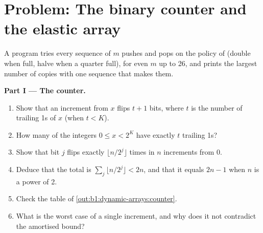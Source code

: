 \section{Problem: The binary counter and the elastic array}\label{sec:b1:dynamic-arrays:problem}

\begin{problem}\label{pb:b1:dynamic-arrays:1}
A program tries every sequence of $m$ pushes and pops on the policy of  (double when full, halve when a
quarter full), for even $m$ up to 26, and prints the largest number of copies with one sequence that makes them.
\label{lst:b1:dynamic-arrays:elastic}
\label{out:b1:dynamic-arrays:elastic}
\label{out:b1:dynamic-arrays:counter-dec}

\medskip\noindent\textbf{Part I --- The counter.}
\begin{enumerate}
\item Show that an increment from $x$ flips $t + 1$ bits, where $t$ is the number of trailing 1s of $x$ (when $t < K$).
\item How many of the integers $0 \leq x < 2^K$ have exactly $t$ trailing 1s?
\item Show that bit $j$ flips exactly $\lfloor n/2^j \rfloor$ times in $n$ increments from 0.
\item Deduce that the total is $\sum_j \lfloor n/2^j \rfloor < 2n$, and that it equals $2n - 1$ when $n$ is a power of 2.
\item Check the table of \cref{out:b1:dynamic-arrays:counter}.
\item What is the worst case of a single increment, and why does it not contradict the amortised bound?
\end{enumerate}


\end{problem}

